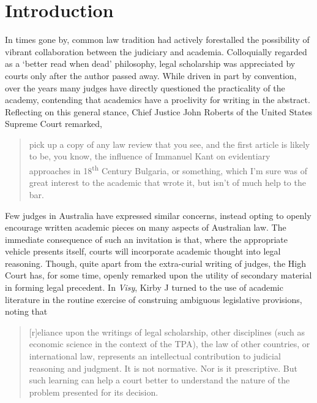 \let\xn\xnote
\section{Introduction}

In times gone by, common law tradition had actively forestalled the possibility of vibrant collaboration between the judiciary and academia. Colloquially regarded as a `better read when dead' philosophy, legal scholarship was appreciated by courts only after the author passed away.\xn{1-1} While driven in part by convention, over the years many judges have directly questioned the practicality of the academy, contending that academics have a proclivity for writing in the abstract.\xn{1-2} Reflecting on this general stance, Chief Justice John Roberts of the United States Supreme Court remarked,

\begin{quote}
pick up a copy of any law review that you see, and the first article is likely to be, you know, the influence of Immanuel Kant on evidentiary approaches in 18\textsuperscript{th} Century Bulgaria, or something, which I’m sure was of great interest to the academic that wrote it, but isn’t of much help to the bar.\xn{1-3}
\end{quote}

Few judges in Australia have expressed similar concerns, instead opting to openly encourage written academic pieces on many aspects of Australian law.\xn{1-4} The immediate consequence of such an invitation is that, where the appropriate vehicle presents itself, courts will incorporate academic thought into legal reasoning.\xn{1-5} Though, quite apart from the extra-curial writing of judges, the High Court has, for some time, openly remarked upon the utility of secondary material in forming legal precedent. In \emph{Visy}, Kirby J turned to the use of academic literature in the routine exercise of construing ambiguous legislative provisions, noting that

\begin{quote}
[r]eliance upon the writings of legal scholarship, other disciplines (such as economic science in the context of the TPA), the law of other countries, or international law, represents an intellectual contribution to judicial reasoning and judgment. It is not normative. Nor is it prescriptive. But such learning can help a court better to understand the nature of the problem presented for its decision.\xn{1-6}
\end{quote}

